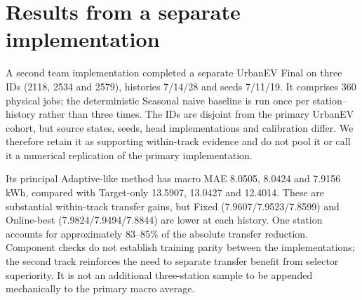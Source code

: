 \documentclass[pdflatex,sn-mathphys-num]{sn-jnl}
\begin{document}
\clearpage\section{Results from a separate implementation}\label{sec:secondary}
A second team implementation completed a separate UrbanEV Final on three IDs (2118, 2534 and 2579), histories 7/14/28 and seeds 7/11/19. It comprises 360 physical jobs; the deterministic Seasonal naive baseline is run once per station--history rather than three times. The IDs are disjoint from the primary UrbanEV cohort, but source states, seeds, head implementations and calibration differ. We therefore retain it as supporting within-track evidence and do not pool it or call it a numerical replication of the primary implementation.

Its principal Adaptive-like method has macro MAE 8.0505, 8.0424 and 7.9156 kWh, compared with Target-only 13.5907, 13.0427 and 12.4014. These are substantial within-track transfer gains, but Fixed (7.9607/7.9523/7.8599) and Online-best (7.9824/7.9494/7.8844) are lower at each history. One station accounts for approximately 83--85\% of the absolute transfer reduction. Component checks do not establish training parity between the implementations; the second track reinforces the need to separate transfer benefit from selector superiority. It is not an additional three-station sample to be appended mechanically to the primary macro average.
\end{document}
